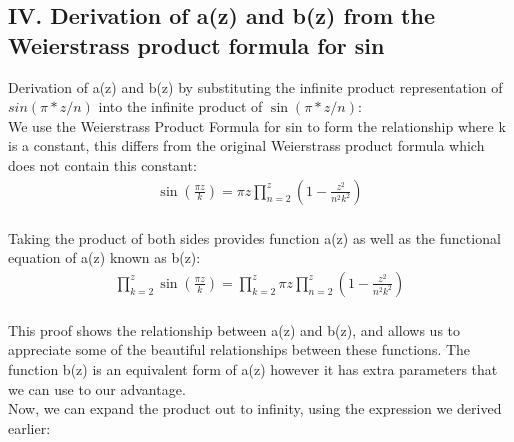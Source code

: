 \documentclass{article}
\begin{document}
\newpage
\subsection*{IV. Derivation of a(z) and b(z) from the Weierstrass product formula for sin}
Derivation of a(z) and b(z) by substituting the infinite product representation of $sin(\pi*z/n)$ into the infinite product of $\sin(\pi*z/n)$: \\

We use the Weierstrass Product Formula for sin to form the relationship where k is a constant, this differs from the original Weierstrass product formula which does not contain this constant: \\
\begin{align*}
	\sin\left(\frac{\pi z}{k}\right) = \pi z\prod_{n=2}^z \left(1-\frac{z^2}{n^2k^2}\right) \\
\end{align*}

Taking the product of both sides provides function a(z) as well as the functional equation of a(z) known as b(z): \\
\begin{align*}
	\prod_{k=2}^z\sin\left(\frac{\pi z}{k}\right) = \prod_{k=2}^z \pi z\prod_{n=2}^z \left(1-\frac{z^2}{n^2k^2}\right) \\
\end{align*}

This proof shows the relationship between a(z) and b(z), and allows us to appreciate some of the beautiful relationships between these functions. The function b(z) is an equivalent form of a(z) however it has extra parameters that we can use to our advantage. \\

Now, we can expand the product out to infinity, using the expression we derived earlier:
\end{document}
